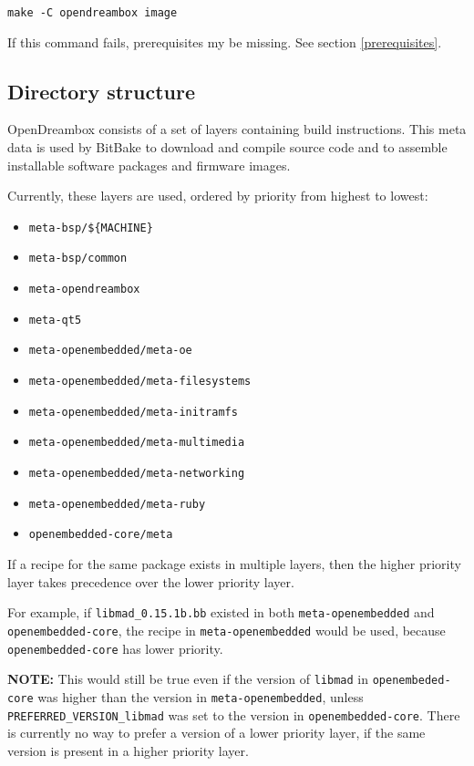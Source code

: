 \documentclass[a4paper]{article}
\newcommand{\shell}[1]{\texttt{\small #1}}
\begin{document}
    \shell{make -C opendreambox image}

    If this command fails, prerequisites my be missing. See section \ref{prerequisites}.

  \subsection{Directory structure}
    OpenDreambox consists of a set of layers containing build instructions.
    This meta data is used by BitBake to download and compile source code
    and to assemble installable software packages and firmware images.

    Currently, these layers are used, ordered by priority from highest to
    lowest:

    \begin{itemize}
      \item \shell{meta-bsp/\$\{MACHINE\}}
      \item \shell{meta-bsp/common}
      \item \shell{meta-opendreambox}
      \item \shell{meta-qt5}
      \item \shell{meta-openembedded/meta-oe}
      \item \shell{meta-openembedded/meta-filesystems}
      \item \shell{meta-openembedded/meta-initramfs}
      \item \shell{meta-openembedded/meta-multimedia}
      \item \shell{meta-openembedded/meta-networking}
      \item \shell{meta-openembedded/meta-ruby}
      \item \shell{openembedded-core/meta}
    \end{itemize}

    If a recipe for the same package exists in multiple layers,
    then the higher priority layer takes precedence over the lower priority
    layer.

    For example, if \shell{libmad\_0.15.1b.bb} existed in both
    \shell{meta-openembedded} and \shell{openembedded-core}, the recipe in
    \shell{meta-openembedded} would be used, because \shell{openembedded-core}
    has lower priority.

    \textbf{NOTE:} This would still be true even if the version of \shell{libmad} in
    \shell{openembeded-core} was higher than the version in \shell{meta-openembedded},
    unless \shell{PREFERRED\_VERSION\_libmad} was set to the version in \shell{openembedded-core}.
    There is currently no way to prefer a version of a lower priority layer, if the
    same version is present in a higher priority layer.
\end{document}
